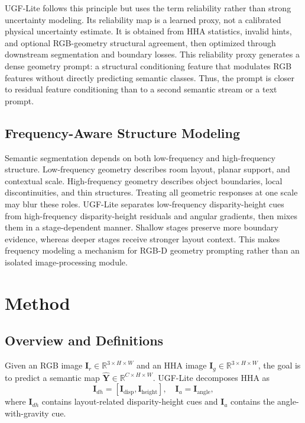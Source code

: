 \documentclass[a4paper,fleqn]{cas-dc}
\begin{document}
UGF-Lite follows this principle but uses the term reliability rather than strong uncertainty modeling. Its reliability map is a learned proxy, not a calibrated physical uncertainty estimate. It is obtained from HHA statistics, invalid hints, and optional RGB-geometry structural agreement, then optimized through downstream segmentation and boundary losses. This reliability proxy generates a dense geometry prompt: a structural conditioning feature that modulates RGB features without directly predicting semantic classes. Thus, the prompt is closer to residual feature conditioning than to a second semantic stream or a text prompt.

\subsection{Frequency-Aware Structure Modeling}

Semantic segmentation depends on both low-frequency and high-frequency structure. Low-frequency geometry describes room layout, planar support, and contextual scale. High-frequency geometry describes object boundaries, local discontinuities, and thin structures. Treating all geometric responses at one scale may blur these roles. UGF-Lite separates low-frequency disparity-height cues from high-frequency disparity-height residuals and angular gradients, then mixes them in a stage-dependent manner. Shallow stages preserve more boundary evidence, whereas deeper stages receive stronger layout context. This makes frequency modeling a mechanism for RGB-D geometry prompting rather than an isolated image-processing module.

\section{Method}\label{sec:method}

\subsection{Overview and Definitions}

Given an RGB image $\mathbf{I}_{r}\in\mathbb{R}^{3\times H\times W}$ and an HHA image $\mathbf{I}_{g}\in\mathbb{R}^{3\times H\times W}$, the goal is to predict a semantic map $\hat{\mathbf{Y}}\in\mathbb{R}^{C\times H\times W}$. UGF-Lite decomposes HHA as
\begin{equation}
  \mathbf{I}_{dh}=[\mathbf{I}_{\mathrm{disp}},\mathbf{I}_{\mathrm{height}}],
  \quad
  \mathbf{I}_{a}=\mathbf{I}_{\mathrm{angle}},
\end{equation}
where $\mathbf{I}_{dh}$ contains layout-related disparity-height cues and $\mathbf{I}_{a}$ contains the angle-with-gravity cue.
\end{document}
